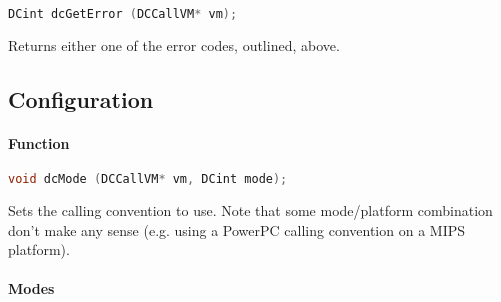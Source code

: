 \begin{lstlisting}[language=c]
DCint dcGetError (DCCallVM* vm);
\end{lstlisting}

Returns either one of the error codes, outlined, above.

\pagebreak

\subsection{Configuration}

\paragraph{Function}

\begin{lstlisting}[language=c]
void dcMode (DCCallVM* vm, DCint mode);
\end{lstlisting}

Sets the calling convention to use. Note that some mode/platform combination
don't make any sense (e.g. using a PowerPC calling convention on a MIPS
platform).

\paragraph{Modes}

